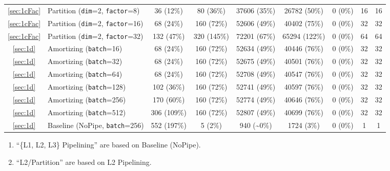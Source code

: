 {\begin{tabularx}{\textwidth}{cl*{5}{c}*{2}{C}}
\ref{sec:1cFac}                     & Partition (\texttt{dim}=2, \texttt{factor}=8) & 36 (12\%) & 80 (36\%) & 37606 (35\%) & 26782 (50\%) & 0 (0\%) & 16 & 16 \\
\ref{sec:1cFac}   & Partition (\texttt{dim}=2, \texttt{factor}=16) & 68 (24\%) & 160 (72\%) & 52606 (49\%) & 40402 (75\%) & 0 (0\%) & 32 & 32 \\
\ref{sec:1cFac}                    & Partition (\texttt{dim}=2, \texttt{factor}=32) & 132 (47\%) & 320 (145\%) & 72201 (67\%) & 65294 (122\%) & 0 (0\%) & 64 & 64 \\
\ref{sec:1d}                             & Amortizing (\texttt{batch}=16) & 68 (24\%) & 160 (72\%) & 52634 (49\%) & 40446 (76\%) & 0 (0\%) & 32 & 32 \\
\ref{sec:1d}                             & Amortizing (\texttt{batch}=32) & 68 (24\%) & 160 (72\%) & 52675 (49\%) & 40501 (76\%) & 0 (0\%) & 32 & 32 \\
\ref{sec:1d}                             & Amortizing (\texttt{batch}=64) & 68 (24\%) & 160 (72\%) & 52708 (49\%) & 40547 (76\%) & 0 (0\%) & 32 & 32 \\
\ref{sec:1d}                            & Amortizing (\texttt{batch}=128) & 102 (36\%) & 160 (72\%) & 52741 (49\%) & 40597 (76\%) & 0 (0\%) & 32 & 32 \\
\ref{sec:1d}           & Amortizing (\texttt{batch}=256) & 170 (60\%) & 160 (72\%) & 52774 (49\%) & 40646 (76\%) & 0 (0\%) & 32 & 32 \\
\ref{sec:1d}                            & Amortizing (\texttt{batch}=512) & 306 (109\%) & 160 (72\%) & 52807 (49\%) & 40699 (76\%) & 0 (0\%) & 32 & 32 \\
\ref{sec:1d}                              & Baseline (NoPipe, \texttt{batch}=256) & 552 (197\%) & 5 (2\%) & 940 (\textasciitilde 0\%) & 1724 (3\%) & 0 (0\%) & 1 & 1 \\
    \bottomrule
\end{tabularx}
}

\begin{enumerate}[nosep]
    \footnotesize
    \item ``\{L1, L2, L3\} Pipelining'' are based on Baseline (NoPipe).
    \item ``L2/Partition'' are based on L2 Pipelining.
\end{enumerate}